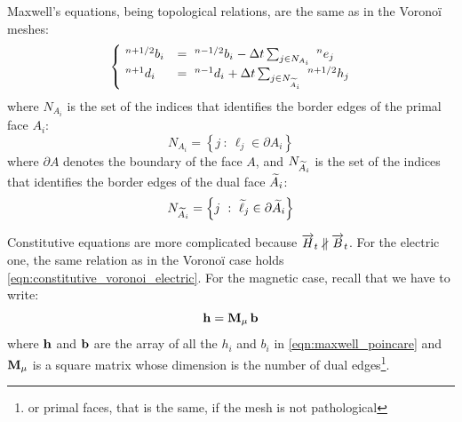Maxwell's equations, being topological relations, are the same as in
the Vorono\"i meshes:
\begin{equation} \label{eqn:maxwell_poincare} \begin{cases}
    \Disc{b_i}{}{n+1/2} & = \Disc{b_i}{}{n-1/2} - \deltat \sum_{j \in
    N_{A_i}} \Disc{e_j}{}{n} \\
    \Disc{d_i}{}{n+1} & = \Disc{d_i}{}{n-1} + \deltat \sum_{j \in
    N_{\Dual{A}_i}} \Disc{h_j}{}{n+1/2}
  \end{cases} \end{equation}
where $N_{A_i}$ is the set of the indices that identifies the border
edges of the primal face $A_i$:
\begin{equation*}
  N_{A_i} = \left\{ j\ :\ \ell_j \in \partial A_i \right\}
\end{equation*}
where $\partial A$ denotes the boundary of the face $A$, and
$N_{\Dual{A}_i}$ is the set of the indices that identifies the border
edges of the dual face $\Dual{A}_i$:
\begin{equation*}
  N_{\Dual{A}_i} = \left\{ j\ :\ \Dual{\ell}_j \in \partial \Dual{A}_i
  \right\}
\end{equation*}

Constitutive equations are more complicated because $\H_t \nparallel
\B_t$. For the electric one, the same relation as in the Vorono\"i
case holds \eqref{eqn:constitutive_voronoi_electric}. For the magnetic
case, recall that we have to write:
\begin{equation*}
  \Array{h} = \Prod{\Matrix{M}_\mu}{\Array{b}}
\end{equation*}
where $\Array{h}$ and $\Array{b}$ are the array of all the $h_i$ and
$b_i$ in \eqref{eqn:maxwell_poincare} and $\Matrix{M}_\mu$ is a square
matrix whose dimension is the number of dual edges\footnote{or primal
  faces, that is the same, if the mesh is not pathological
  }.

